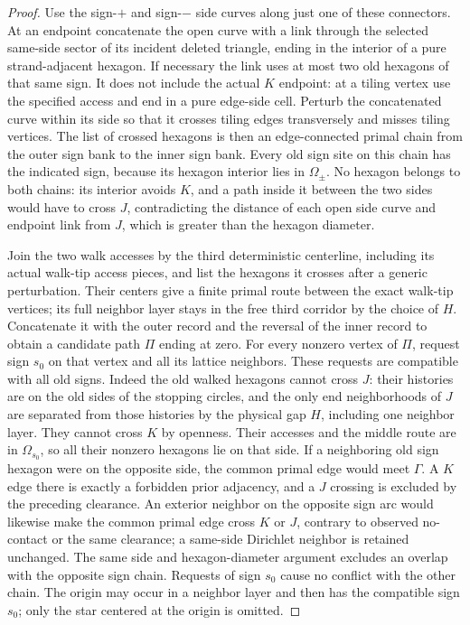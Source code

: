 \begin{proof}
Use the sign-\(+\) and sign-\(-\) side curves along just one of these
connectors.  At an endpoint concatenate the open curve with a link through
the selected same-side sector of its incident deleted triangle, ending
in the interior of a pure strand-adjacent hexagon.  If necessary the link
uses at most two old hexagons of that same sign.  It does not include the
actual \(K\) endpoint: at a tiling vertex use the specified access and
end in a pure edge-side cell.  Perturb the concatenated curve within its
side so that it crosses tiling edges transversely and misses tiling
vertices.  The list of crossed hexagons is then an edge-connected primal
chain from the outer sign bank to the inner sign bank.  Every old sign
site on this chain has the indicated sign, because its hexagon interior
lies in \(\Omega_\pm\).  No hexagon belongs to both chains: its interior
avoids \(K\), and a path inside it between the two sides would have to
cross \(J\), contradicting the distance of each open side curve and
endpoint link from \(J\), which is greater than the hexagon diameter.

Join the two walk accesses by the third deterministic centerline,
including its actual walk-tip access pieces, and list the hexagons it
crosses after a generic perturbation.  Their centers give a finite primal
route between the exact walk-tip vertices; its full neighbor layer stays
in the free third corridor by the choice of \(H\).  Concatenate it with
the outer record and the reversal of the inner record to obtain a
candidate path \(\Pi\) ending at zero.  For
every nonzero vertex of \(\Pi\), request sign \(s_0\) on that vertex
and all its lattice neighbors.  These requests are compatible with all
old signs.  Indeed the old walked hexagons cannot cross \(J\): their
histories are on the old sides of the stopping circles, and the only
end neighborhoods of \(J\) are separated from those histories by the
physical gap \(H\), including one neighbor layer.  They cannot cross
\(K\) by openness.  Their accesses and the middle route are in
\(\Omega_{s_0}\), so all their nonzero hexagons lie on that side.
If a neighboring old sign hexagon were on the opposite side, the common
primal edge would meet \(\Gamma\).  A \(K\) edge there is exactly a
forbidden prior adjacency, and a \(J\) crossing is excluded by the
preceding clearance.  An exterior neighbor on the opposite sign arc
would likewise make the common primal edge cross \(K\) or \(J\),
contrary to observed no-contact or the same clearance; a same-side
Dirichlet neighbor is retained unchanged.  The same
side and hexagon-diameter argument excludes an overlap with the opposite
sign chain.  Requests of sign \(s_0\) cause no conflict with the other
chain.  The origin may occur in a neighbor layer and then has the
compatible sign \(s_0\); only the star centered at the origin is omitted.


\end{proof}
